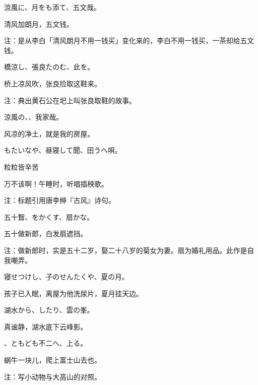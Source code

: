 \begin{haiku}
    {\FH 涼風に、月をも添て、五文哉。}

    {\FK 清风加朗月，五文钱。}

    {\FT 注：是从李白「清风朗月不用一钱买」变化来的，李白不用一钱买，一茶却给五文钱。}
\end{haiku}

\begin{haiku}
    {\FH 橋涼し、張良たのむ、此を。}

    {\FK 桥上凉风吹，张良捡取这鞋来。}

    {\FT 注：典出黄石公在圯上叫张良取鞋的故事。}
\end{haiku}

\begin{haiku}
    {\FH 涼風の、、我家哉。}

    {\FK 风凉的净土，就是我的房屋。}
\end{haiku}

\begin{haiku}
    {\FH もたいなや、昼寝して聞、田うへ唄。}

    {\FK 粒粒皆辛苦}

    {\FK 万不该啊！午睡时，听唱插秧歌。}

    {\FT 注：标题引用唐李绅『古风』诗句。}
\end{haiku}

\begin{haiku}
    {\FH 五十聟、をかくす、扇かな。}

    {\FK 五十做新郎，白发扇遮挡。}

    {\FT 注：做新郎时，实是五十二岁，娶二十八岁的菊女为妻。扇为婚礼用品。此作是自我嘲弄。}
\end{haiku}

\begin{haiku}
    {\FH 寝せつけし、子のせんたくや、夏の月。}

    {\FK 孩子已入眠，离屋为他洗尿片，夏月挂天边。}
\end{haiku}

\begin{haiku}
    {\FH 湖水から、したり、雲の峯。}

    {\FK 真谧静，湖水底下云峰影。}
\end{haiku}

\begin{haiku}
    {\FH {}、ともども不二へ、上る。}

    {\FK 蜗牛一块儿，爬上富士山去也。}

    {\FT 注：写小动物与大高山的对照。}
\end{haiku}

